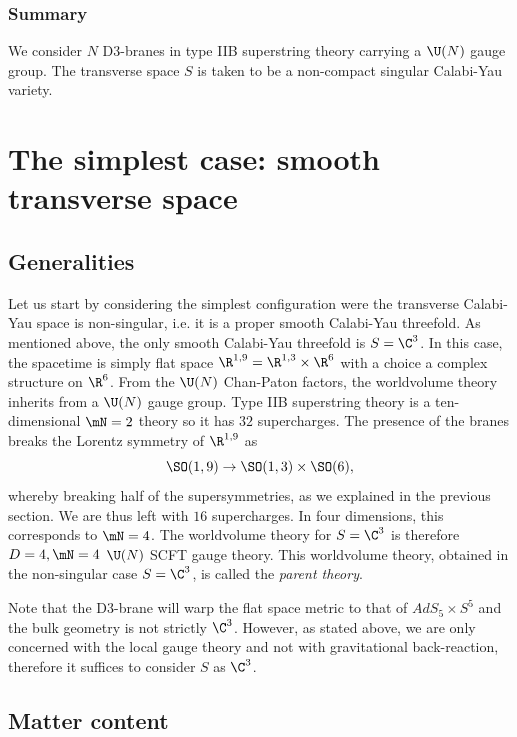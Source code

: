 \documentclass{worksheetclass}
\begin{document}
    \subsubsection*{Summary}

        We consider $N$ D$3$-branes in type IIB superstring theory carrying a $\U(N)$ gauge group. The transverse space $S$ is taken to be a non-compact singular Calabi-Yau variety.

\section{The simplest case: smooth transverse space}

    \subsection{Generalities}

        Let us start by considering the simplest configuration were the transverse Calabi-Yau space is non-singular, i.e. it is a proper smooth Calabi-Yau threefold. As mentioned above, the only smooth Calabi-Yau threefold is $S=\C^3$. In this case, the spacetime is simply flat space $\R^{1,9}=\R^{1,3}\times\R^6$ with a choice a complex structure on $\R^6$. From the $\U(N)$ Chan-Paton factors, the worldvolume theory inherits from a $\U(N)$ gauge group. Type IIB superstring theory is a ten-dimensional $\mN=2$ theory so it has $32$ supercharges. The presence of the branes breaks the Lorentz symmetry of $\R^{1,9}$ as
        \begin{equation}
            \SO(1,9)\to\SO(1,3)\times\SO(6),
        \end{equation}
        whereby breaking half of the supersymmetries, as we explained in the previous section. We are thus left with $16$ supercharges. In four dimensions, this corresponds to $\mN=4$. The worldvolume theory for $S=\C^3$ is therefore $D=4,\mN=4$ $\U(N)$ SCFT gauge theory. This worldvolume theory, obtained in the non-singular case $S=\C^3$, is called the \emph{parent theory}.

        Note that the D$3$-brane will warp the flat space metric to that of $AdS_5\times S^5$ and the bulk geometry is not strictly $\C^3$. However, as stated above, we are only concerned with the local gauge theory and not with gravitational back-reaction, therefore it suffices to consider $S$ as $\C^3$.

    \subsection{Matter content}
\end{document}
